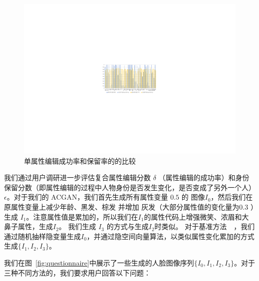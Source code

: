 \begin{figure}[!t]
    \begin{center}
         \includegraphics[width=1\linewidth]{figures/ACGAN/excel_histogram.pdf}
    \end{center}
    \caption{单属性编辑成功率和保留率的的比较}
    \label{fig:histogram}
\end{figure}

我们通过用户调研进一步评估复合属性编辑分数 $\delta$ （属性编辑的成功率）和身份保留分数（即属性编辑的过程中人物身份是否发生变化，是否变成了另外一个人） $\epsilon$。对于我们的 ACGAN，我们首先生成所有属性变量 $0.5$ 的 图像$I_0$，然后我们在原属性变量上减少年龄、黑发、棕发 并增加 灰发（大部分属性值的变化量为$0.3$ ）生成 $I_1$。注意属性值是累加的，所以我们在$I_1$的属性代码上增强微笑、浓眉和大鼻子属性，生成$I_2$。 我们生成 $I_3$ 的方式与生成$I_2$时类似。 对于基准方法~\cite{interfacegan}~\cite{iclr2021}，我们通过随机抽样隐变量生成$I_0$，并通过隐空间向量算法，以类似属性变化累加的方式生成$\{I_1, I_2, I_3\}$。

我们在图~\ref{fig:questionnaire}中展示了一些生成的人脸图像序列$\{I_0, I_1, I_2, I_3\}$。对于三种不同方法的，我们要求用户回答以下问题：


